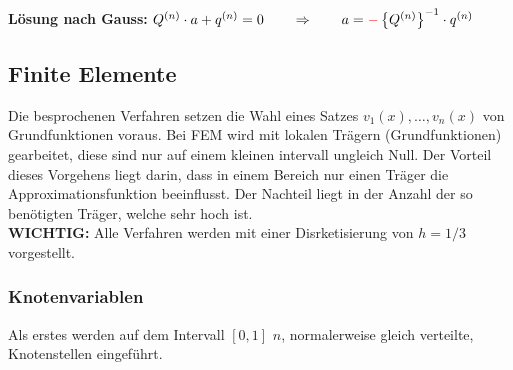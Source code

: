 \textbf{Lösung nach Gauss:} $Q^{(n)}\cdot a+q^{(n)}=0\qquad \Rightarrow \qquad a=\textcolor{red}{\mathbf{-}}\left\{Q^{(n)}\right\}^{-1}\cdot q^{(n)}$

\subsection{Finite Elemente}

Die besprochenen Verfahren setzen die Wahl eines Satzes $v_1(x),\ldots,v_n(x)$ von Grundfunktionen voraus. Bei FEM wird mit lokalen Trägern (Grundfunktionen) gearbeitet, diese sind nur auf einem kleinen intervall ungleich Null. Der Vorteil dieses Vorgehens liegt darin, dass in einem Bereich nur einen Träger die Approximationsfunktion beeinflusst. Der Nachteil liegt in der Anzahl der so benötigten Träger, welche sehr hoch ist.\\

\textbf{WICHTIG:} Alle Verfahren werden mit einer Disrketisierung von $h=1/3$ vorgestellt.

\subsubsection{Knotenvariablen}
Als erstes werden auf dem Intervall $[0,1]$ $n$, normalerweise gleich verteilte,   Knotenstellen eingeführt.

